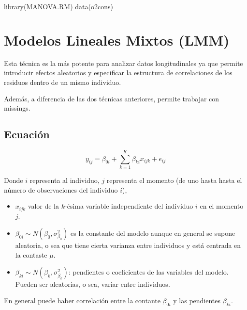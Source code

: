\documentclass[
]{book}
\newenvironment{Shaded}{\begin{snugshade}}{\end{snugshade}}
\newcommand{\FunctionTok}[1]{\textcolor[rgb]{0.00,0.00,0.00}{#1}}
\newcommand{\NormalTok}[1]{#1}
\begin{document}
\begin{Shaded}
\begin{Highlighting}[]
\FunctionTok{library}\NormalTok{(MANOVA.RM)}
\FunctionTok{data}\NormalTok{(o2cons)}
\end{Highlighting}
\end{Shaded}

\begin{quote}
\end{quote}

\hypertarget{modelos-lineales-mixtos-lmm}{%
\chapter{Modelos Lineales Mixtos (LMM)}\label{modelos-lineales-mixtos-lmm}}

Esta técnica es la más potente para analizar datos longitudinales ya que permite introducir efectos aleatorios y especificar la estructura de correlaciones de los residuos dentro de un mismo individuo.

Además, a diferencia de las dos técnicas anteriores, permite trabajar con missings.

\hypertarget{ecuaciuxf3n}{%
\section{Ecuación}\label{ecuaciuxf3n}}

\[
y_{ij} = \beta_{0i} + \sum_{k=1}^K \beta_{ki} x_{ijk} + e_{ij}
\]

Donde \(i\) representa al individuo, \(j\) representa el momento (de uno hasta hasta el número de observaciones del individuo \(i\)),

\begin{itemize}
\item
  \(x_{ijk}\) valor de la \(k\)-ésima variable independiente del individuo \(i\) en el momento \(j\).
\item
  \(\beta_{0i} \sim N\left(\beta_0, \sigma_{\beta_0}^2\right)\) es la constante del modelo aunque en general se supone aleatoria, o sea que tiene cierta varianza entre individuos y está centrada en la contaste \(\mu\).
\item
  \(\beta_{ki} \sim N\left(\beta_k, \sigma_{\beta_k}^2\right)\): pendientes o coeficientes de las variables del modelo. Pueden ser aleatorias, o sea, variar entre individuos.
\end{itemize}

En general puede haber correlación entre la contante \(\beta_{0i}\) y las pendientes \(\beta_{ki}\).
\end{document}
